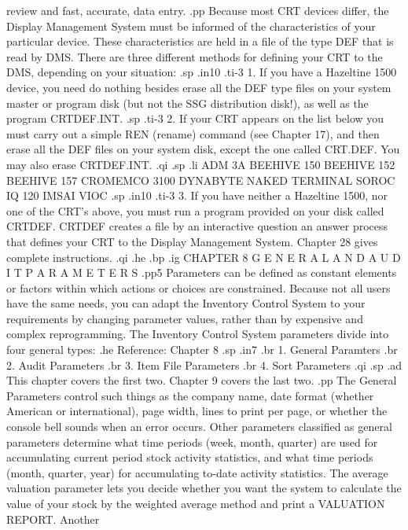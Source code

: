review and fast, accurate, data entry.
.pp
Because most CRT devices differ, the Display Management System must
be informed of the characteristics of your particular device.  These
characteristics are held in a file of the type DEF that is read by DMS.
There
are three different methods for defining your CRT to the DMS, depending
on your situation:
.sp
.in10
.ti-3
1. If you have a Hazeltine 1500 device, you need do nothing besides
erase all the DEF type files on your system master or program disk
(but not the SSG distribution disk!), as well as the program CRTDEF.INT.
.sp
.ti-3
2. If your CRT appears on the list below you must carry out a simple
REN (rename) command
(see Chapter 17), and then erase all the DEF
files on your system disk, except the one called CRT.DEF.  You may also erase
CRTDEF.INT.
.qi
.sp
.li
		    ADM 3A
		    BEEHIVE 150
		    BEEHIVE 152
		    BEEHIVE 157
		    CROMEMCO 3100
		    DYNABYTE NAKED TERMINAL
		    SOROC IQ 120
		    IMSAI VIOC
.sp
.in10
.ti-3
3. If you have neither a Hazeltine 1500, nor one of the CRT's above,
you must run a program provided on your disk called CRTDEF.  CRTDEF creates
a file by an interactive question an answer process
that defines your CRT to the Display Management System.
Chapter 28 gives complete instructions.
.qi
.he
.bp
.ig
CHAPTER 8
G E N E R A L	A N D	A U D I T   P A R A M E T E R S
.pp5
Parameters can be defined as constant elements or
factors within which actions or
choices are constrained.  Because not all users have the same needs, you can
adapt the Inventory Control System to your requirements
by changing parameter values, rather than by expensive and complex
reprogramming.	The Inventory Control System parameters divide into four
general types:
.he Reference: Chapter 8
.sp
.in7
.br
1. General Paramters
.br
2. Audit Parameters
.br
3. Item File Parameters
.br
4. Sort Parameters
.qi
.sp
.ad
This chapter covers the first two.  Chapter 9 covers the last two.
.pp
The General Parameters control such things as the company name, date format
(whether American or international), page width, lines to print per page,
or whether the console bell sounds when an error occurs.  Other parameters
classified as general parameters determine what time periods (week, month,
quarter) are used for accumulating current period stock activity statistics,
and what time periods (month, quarter, year) for accumulating to-date
activity statistics.  The average valuation parameter lets you decide
whether you want the system to calculate the value of your stock by the
weighted average method and print a VALUATION REPORT.  Another
